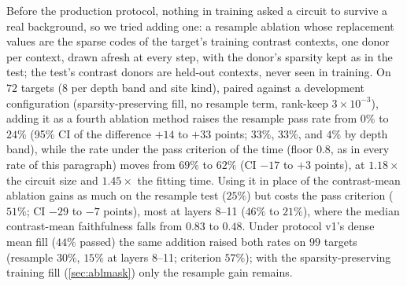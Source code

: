 \documentclass[10pt]{article}
\begin{document}
Before the production protocol, nothing in training asked a circuit to survive a real background, so we tried adding one: a resample ablation whose replacement values are the sparse codes of the target's training contrast contexts, one donor per context, drawn afresh at every step, with the donor's sparsity kept as in the test; the test's contrast donors are held-out contexts, never seen in training.
On $72$ targets ($8$ per depth band and site kind), paired against a development configuration (sparsity-preserving fill, no resample term, rank-keep $3 \times 10^{-3}$), adding it as a fourth ablation method raises the resample pass rate from $0\%$ to $24\%$ (95\% CI of the difference $+14$ to $+33$ points; $33\%$, $33\%$, and $4\%$ by depth band), while the rate under the pass criterion of the time (floor $0.8$, as in every rate of this paragraph) moves from $69\%$ to $62\%$ (CI $-17$ to $+3$ points), at $1.18\times$ the circuit size and $1.45\times$ the fitting time.
Using it in place of the contrast-mean ablation gains as much on the resample test ($25\%$) but costs the pass criterion ($51\%$; CI $-29$ to $-7$ points), most at layers 8--11 ($46\%$ to $21\%$), where the median contrast-mean faithfulness falls from $0.83$ to $0.48$.
Under protocol v1's dense mean fill ($44\%$ passed) the same addition raised both rates on $99$ targets (resample $30\%$, $15\%$ at layers 8--11; criterion $57\%$); with the sparsity-preserving training fill (\cref{sec:ablmask}) only the resample gain remains.
\end{document}

